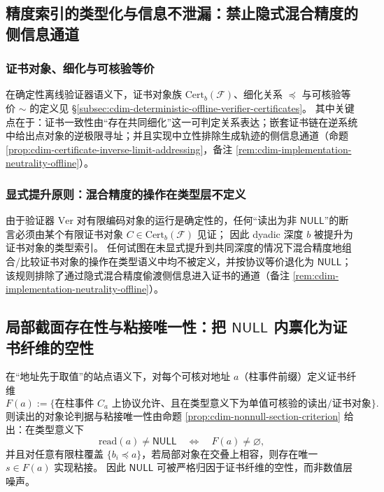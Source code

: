 \subsection{精度索引的类型化与信息不泄漏：禁止隐式混合精度的侧信息通道}\label{subsec:cdim-typed-precision-no-leak}
\subsubsection{证书对象、细化与可核验等价}
在确定性离线验证器语义下，证书对象族 \(\mathrm{Cert}_b(\mathcal F)\)、细化关系 \(\preceq\) 与可核验等价 \(\sim\) 的定义见 \S\ref{subsec:cdim-deterministic-offline-verifier-certificates}。
其中关键点在于：证书一致性由“存在共同细化”这一可判定关系表达；嵌套证书链在逆系统中给出点对象的逆极限寻址；并且实现中立性排除生成轨迹的侧信息通道（命题 \ref{prop:cdim-certificate-inverse-limit-addressing}，备注 \ref{rem:cdim-implementation-neutrality-offline}）。

\subsubsection{显式提升原则：混合精度的操作在类型层不定义}
\begin{remark}[显式提升原则与混合精度的类型否定]\label{rem:cdim-explicit-lifting-no-mixed-precision}
由于验证器 \(\mathrm{Ver}\) 对有限编码对象的运行是确定性的，任何“读出为非 \(\mathsf{NULL}\)”的断言必须由某个有限证书对象 \(C\in\mathrm{Cert}_b(\mathcal F)\) 见证；
因此 dyadic 深度 \(b\) 被提升为证书对象的类型索引。
任何试图在未显式提升到共同深度的情况下混合精度地组合/比较证书对象的操作在类型语义中均不被定义，并按协议等价退化为 \(\mathsf{NULL}\)；
该规则排除了通过隐式混合精度偷渡侧信息进入证书的通道（备注 \ref{rem:cdim-implementation-neutrality-offline}）。
\end{remark}

\subsection{局部截面存在性与粘接唯一性：把 \texorpdfstring{$\mathsf{NULL}$}{NULL} 内禀化为证书纤维的空性}\label{subsec:cdim-local-section-gluing-null}
在“地址先于取值”的站点语义下，对每个可核对地址 \(a\)（柱事件前缀）定义证书纤维
\[
F(a):=\{\text{在柱事件 }C_a\text{ 上协议允许、且在类型意义下为单值可核验的读出/证书对象}\}.
\]
则读出的对象论判据与粘接唯一性由命题 \ref{prop:cdim-nonnull-section-criterion} 给出：在类型意义下
\[
\mathrm{read}(a)\neq \mathsf{NULL}\quad\Longleftrightarrow\quad F(a)\neq\varnothing,
\]
并且对任意有限柱覆盖 \(\{b_i\preceq a\}\)，若局部对象在交叠上相容，则存在唯一 \(s\in F(a)\) 实现粘接。
因此 \(\mathsf{NULL}\) 可被严格归因于证书纤维的空性，而非数值层噪声。

